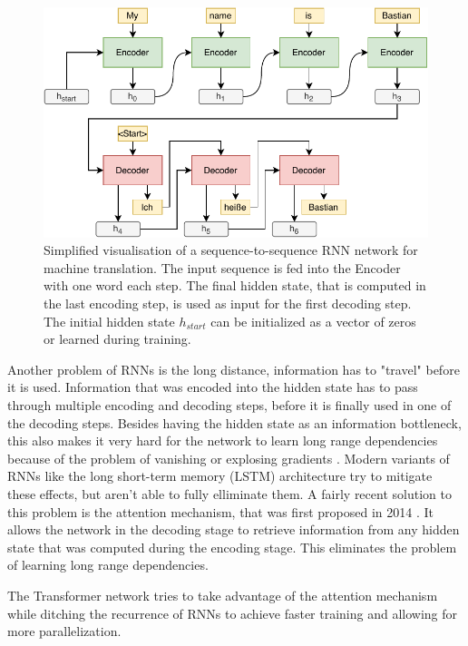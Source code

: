 \begin{figure}[h]
\centering
\includegraphics{figures/rnn-visualisation}
\caption{Simplified visualisation of a sequence-to-sequence RNN network for machine translation. The input sequence is fed into the Encoder with one word each step. The final hidden state, that is computed in the last encoding step, is used as input for the first decoding step. The initial hidden state $h_{start}$ can be initialized as a vector of zeros or learned during training.}
\label{fig:rnn-visualisation}
\end{figure}

Another problem of RNNs is the long distance, information has to "travel" before it is used.
Information that was encoded into the hidden state has to pass through multiple encoding and decoding steps, before it is finally used in one of the decoding steps.
Besides having the hidden state as an information bottleneck, this also makes it very hard for the network to learn long range dependencies because of the problem of vanishing or explosing gradients \cite{Hochreiter01gradientflow}.
Modern variants of RNNs like the long short-term memory (LSTM) architecture \cite{Hochreiter1997} try to mitigate these effects, but aren't able to fully elliminate them.
A fairly recent solution to this problem is the attention mechanism, that was first proposed in 2014 \cite{1409.0473}.
It allows the network in the decoding stage to retrieve information from any hidden state that was computed during the encoding stage.
This eliminates the problem of learning long range dependencies.

The Transformer network tries to take advantage of the attention mechanism while ditching the recurrence of RNNs to achieve faster training and allowing for more parallelization.

